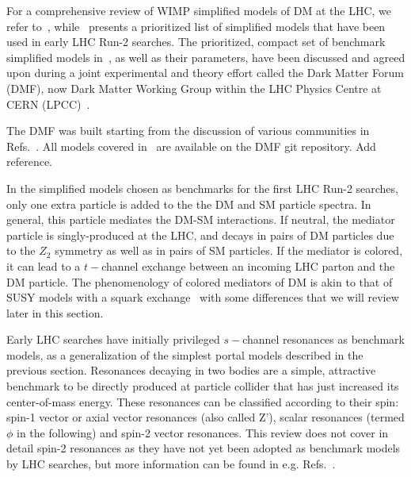 For a comprehensive review of WIMP simplified models of DM at the LHC, we refer to~\cite{Arcadi:2017kky}, while~\cite{Abercrombie:2015wmb} presents a prioritized list of simplified models that have been used in early LHC Run-2 searches. The prioritized, compact set of benchmark simplified models in~\cite{Abercrombie:2015wmb}, as well as their parameters, have been discussed and agreed upon during a joint experimental and theory effort called the Dark Matter Forum (DMF), now Dark Matter Working Group within the LHC Physics Centre at CERN (LPCC)~\cite{DMWG}. 

\begin{marginnote}[]
The DMF was built starting from the discussion of various communities in Refs.~\cite{Yavin:14092893,Malik:2014ggr,Abdallah:2015ter}. All models covered in~\cite{Abercrombie:2015wmb} are available on the DMF git repository. Add reference. 
\end{marginnote}

In the simplified models chosen as benchmarks for the first LHC Run-2 searches, only one extra particle is added to the the DM and SM particle spectra. In general, this particle mediates the DM-SM interactions. If neutral, the mediator particle is singly-produced at the LHC, and decays in pairs of DM particles due to the $Z_2$ symmetry as well as in pairs of SM particles. If the mediator is colored, it can lead to a $t-$channel exchange between an incoming LHC parton and the DM particle. The phenomenology of colored mediators of DM is akin to that of SUSY models with a squark exchange~\cite{Papucci:2014iwa,An:2013xka,Bell:2012rg} with some differences that we will review later in this section. 

Early LHC searches have initially privileged $s-$channel resonances as benchmark models, as a generalization of the simplest portal models described in the previous section. Resonances decaying in two bodies
are a simple, attractive benchmark to be directly produced at particle collider that has just increased its center-of-mass energy. These resonances can be classified according to their spin: spin-1 vector or axial vector resonances (also called Z'), scalar resonances (termed $\phi$ in the following) and spin-2 vector resonances. This review does not cover in detail spin-2 resonances as they have not yet been adopted as benchmark models by LHC searches, but more information can be found in e.g. Refs.~\cite{Kraml:2017atm,Han:2015cty}.



